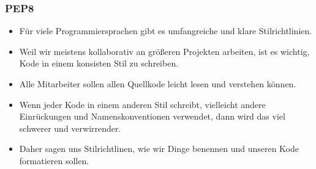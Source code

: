 \documentclass[aspectratio=169,mathserif,notheorems]{beamer}%
\begin{document}
%
\begin{frame}%
\frametitle{PEP8}%
\begin{itemize}%
\item Für viele Programmiersprachen gibt es umfangreiche und klare Stilrichtlinien.%
\item<2-> Weil wir meistens kollaborativ an größeren Projekten arbeiten, ist es wichtig, Kode in einem konsisten Stil zu schreiben.%
\item<3-> Alle Mitarbeiter sollen allen Quellkode leicht lesen und verstehen können.
\item<4-> Wenn jeder Kode in einem anderen Stil schreibt, vielleicht andere Einrückungen und Namenskonventionen verwendet, dann wird das viel schwerer und verwirrender.%
\item<5-> Daher sagen uns Stilrichtlinen, wie wir Dinge benennen und unseren Kode formatieren sollen.%
\end{itemize}%
%
%
\end{frame}%
%
\end{document}
